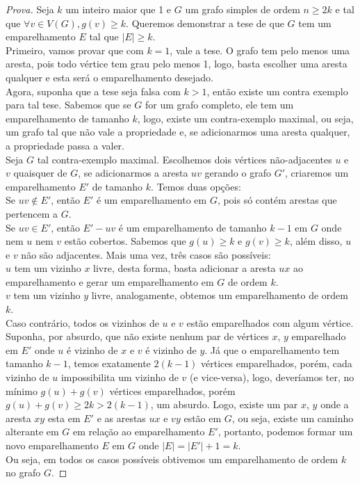 \documentclass[12pt]{article}
\begin{document}
\begin{proof}[Prova]
Seja $k$ um inteiro maior que 1 e $G$ um grafo simples de ordem $n \geq 2k$ e tal que $\forall v \in V(G), g(v) \geq k$. Queremos demonstrar a tese de que $G$ tem um emparelhamento $E$ tal que $|E| \geq k$. \\
Primeiro, vamos provar que com $k = 1$, vale a tese. O grafo tem pelo menos uma aresta, pois todo vértice tem grau pelo menos 1, logo, basta escolher uma aresta qualquer e esta será o emparelhamento desejado. \\
Agora, suponha que a tese seja falsa com $k > 1$, então existe um contra exemplo para tal tese. Sabemos que se $G$ for um grafo completo, ele tem um emparelhamento de tamanho $k$, logo, existe um contra-exemplo maximal, ou seja, um grafo tal que não vale a propriedade e, se adicionarmos uma aresta qualquer, a propriedade passa a valer. \\
Seja $G$ tal contra-exemplo maximal. Escolhemos dois vértices não-adjacentes $u$ e $v$ quaisquer de $G$, se adicionarmos a aresta $uv$ gerando o grafo $G'$, criaremos um emparelhamento $E'$ de tamanho $k$. Temos duas opções: \\
Se $uv \notin E'$, então $E'$ é um emparelhamento em $G$, pois só contém arestas que pertencem a $G$. \\
Se $uv \in E'$, então $E' - uv$ é um emparelhamento de tamanho $k-1$ em $G$ onde nem $u$ nem $v$ estão cobertos. Sabemos que $g(u) \geq k$ e $g(v) \geq k$, além disso, $u$ e $v$ não são adjacentes. Mais uma vez, três casos são possíveis: \\
$u$ tem um vizinho $x$ livre, desta forma, basta adicionar a aresta $ux$ ao emparelhamento e gerar um emparelhamento em $G$ de ordem $k$. \\
$v$ tem um vizinho $y$ livre, analogamente, obtemos um emparelhamento de ordem $k$. \\
Caso contrário, todos os vizinhos de $u$ e $v$ estão emparelhados com algum vértice. Suponha, por absurdo, que não existe nenhum par de vértices $x$, $y$ emparelhado em $E'$ onde $u$ é vizinho de $x$ e $v$ é vizinho de $y$. Já que o emparelhamento tem tamanho $k-1$, temos exatamente $2(k-1)$ vértices emparelhados, porém, cada vizinho de $u$ impossibilita um vizinho de $v$ (e vice-versa), logo, deveríamos ter, no mínimo $g(u) + g(v)$ vértices emparelhados, porém $g(u) + g(v) \geq 2k > 2(k-1)$, um absurdo. Logo, existe um par $x$, $y$ onde a aresta $xy$ esta em $E'$ e as arestas $ux$ e $vy$ estão em $G$, ou seja, existe um caminho alterante em $G$ em relação ao emparelhamento $E'$, portanto, podemos formar um novo emparelhamento $E$ em $G$ onde $|E| = |E'| + 1 = k$. \\
Ou seja, em todos os casos possíveis obtivemos um emparelhamento de ordem $k$ no grafo $G$.
\end{proof}
\end{document}
